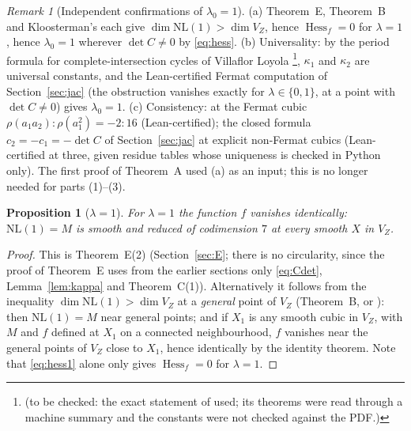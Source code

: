 \documentclass[10pt]{article}
\numberwithin{equation}{section}
\newtheorem{proposition}[theorem]{Proposition}
\theoremstyle{remark}
\newtheorem{remark}[theorem]{Remark}
\newcommand{\NL}{\mathrm{NL}}
\newcommand{\VZ}{V_Z}
\newcommand{\Hess}{\operatorname{Hess}}
\newcommand{\tbc}[1]{\footnote{(to be checked: #1)}}
\begin{document}
\begin{remark}[Independent confirmations of $\lambda_0=1$]\label{rem:conf}
(a) Theorem~E, Theorem~B and Kloosterman's \cite[Cor.~6.5]{Kl1} each give $\dim\NL(1)>\dim\VZ$, hence
$\Hess_f=0$ for $\lambda=1$, hence $\lambda_0=1$ wherever $\det C\neq0$ by \eqref{eq:hess}.
(b) Universality: by the period formula for complete-intersection cycles of Villaflor Loyola
\cite{VL}\tbc{the exact statement of \cite{VL} used; its theorems were read through a machine summary and the
constants were not checked against the PDF.}, $\kappa_1$ and $\kappa_2$ are
universal constants, and the Lean-certified Fermat computation of Section~\ref{sec:jac} (the obstruction
vanishes exactly for $\lambda\in\{0,1\}$, at a point with $\det C\ne0$) gives $\lambda_0=1$.
(c) Consistency: at the Fermat cubic $\rho(a_1a_2):\rho(a_1^2)=-2:16$ (Lean-certified); the closed formula
$c_2=-c_1=-\det C$ of Section~\ref{sec:jac} at explicit non-Fermat cubics (Lean-certified at three, given
residue tables whose uniqueness is checked in Python only).
The first proof of Theorem~A used (a) as an input; this is no longer needed for parts (1)--(3).
\end{remark}

\begin{proposition}[$\lambda=1$]\label{prop:one}
For $\lambda=1$ the function $f$ vanishes identically: $\NL(1)=M$ is smooth and reduced of codimension $7$ at
every smooth $X$ in $\VZ$.
\end{proposition}
\begin{proof}
This is Theorem~E(2) (Section~\ref{sec:E}; there is no circularity, since the proof of Theorem~E uses from the
earlier sections only \eqref{eq:Cdet}, Lemma~\ref{lem:kappa} and Theorem~C(1)). Alternatively it follows from the
inequality
$\dim\NL(1)>\dim\VZ$ at a \emph{general} point of $\VZ$ (Theorem~B, or \cite[Cor.~6.5]{Kl1}): then $\NL(1)=M$
near general points; and if $X_1$ is any smooth cubic in $\VZ$, with $M$ and $f$ defined at $X_1$ on a connected
neighbourhood, $f$ vanishes near the general points of $\VZ$ close to $X_1$, hence identically by the identity
theorem. Note that \eqref{eq:hess1} alone only gives $\Hess_f=0$ for $\lambda=1$.
\end{proof}
\end{document}
